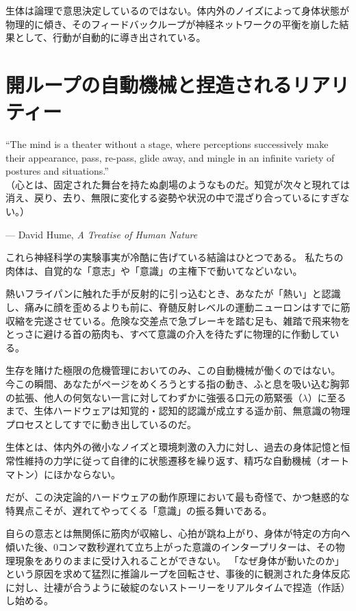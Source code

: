 生体は論理で意思決定しているのではない。体内外のノイズによって身体状態が物理的に傾き、そのフィードバックループが神経ネットワークの平衡を崩した結果として、行動が自動的に導き出されている。

\section{開ループの自動機械と捏造されるリアリティー}
\epigraph{``The mind is a theater without a stage, where perceptions successively make their appearance, pass, re-pass, glide away, and mingle in an infinite variety of postures and situations.''\\
\small（心とは、固定された舞台を持たぬ劇場のようなものだ。知覚が次々と現れては消え、戻り、去り、無限に変化する姿勢や状況の中で混ざり合っているにすぎない。）}{--- David Hume, \textit{A Treatise of Human Nature}}

これら神経科学の実験事実が冷酷に告げている結論はひとつである。
私たちの肉体は、自覚的な「意志」や「意識」の主権下で動いてなどいない。

熱いフライパンに触れた手が反射的に引っ込むとき、あなたが「熱い」と認識し、痛みに顔を歪めるよりも前に、脊髄反射レベルの運動ニューロンはすでに筋収縮を完遂させている。危険な交差点で急ブレーキを踏む足も、雑踏で飛来物をとっさに避ける首の筋肉も、すべて意識の介入を待たずに物理的に作動している。

生存を賭けた極限の危機管理においてのみ、この自動機械が働くのではない。
今この瞬間、あなたがページをめくろうとする指の動き、ふと息を吸い込む胸郭の拡張、他人の何気ない一言に対してわずかに強張る口元の筋緊張（$\lambda$）に至るまで、生体ハードウェアは知覚的・認知的認識が成立する遥か前、無意識の物理プロセスとしてすでに動き出しているのだ。

生体とは、体内外の微小なノイズと環境刺激の入力に対し、過去の身体記憶と恒常性維持の力学に従って自律的に状態遷移を繰り返す、精巧な自動機械（オートマトン）にほかならない。

だが、この決定論的ハードウェアの動作原理において最も奇怪で、かつ魅惑的な特異点こそが、遅れてやってくる「意識」の振る舞いである。

自らの意志とは無関係に筋肉が収縮し、心拍が跳ね上がり、身体が特定の方向へ傾いた後、0コンマ数秒遅れて立ち上がった意識のインタープリターは、その物理現象をありのままに受け入れることができない。
「なぜ身体が動いたのか」という原因を求めて猛烈に推論ループを回転させ、事後的に観測された身体反応に対し、辻褄が合うように破綻のないストーリーをリアルタイムで捏造（作話）し始める。

